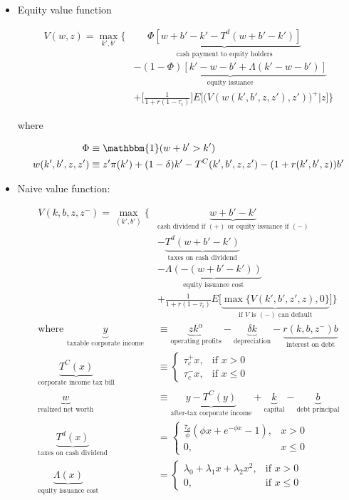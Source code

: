 \documentclass{article}
\newcommand{\one}{\mathbbm{1}}
\begin{document}
\begin{itemize}
\item Equity value function

\begin{align*}
V(w, z) 
= \max_{k', b'} \Bigg\{ &\; \; \;  \;  \; 
\underbrace{\Phi [w + b' - k' - T^d(w + b' - k')]}_{\text{cash payment to equity holders}}\\
&\underbrace{- (1-\Phi) [k' - w - b' + \Lambda(k'-w - b')]}_{\text{equity issuance}}\\
&+ \Bigg[ \frac{1}{1 + r ( 1-\tau_i)}\Bigg] E\Bigg[\Big(V(w(k', b', z, z'), z')\Big)^+\Bigg| z \Bigg]\Bigg\}
\end{align*}

where 

\begin{align*}
\Phi &\equiv \one (w + b' > k')\\
w(k', b', z, z') &\equiv z' \pi(k') + (1-\delta) k' - T^C(k', b', z, z') - (1 +r(k', b', z)) b'
\end{align*}

\pagebreak

\item Naive value function:

\begin{align*}
V(k, b, z, z^-) =
\max_{(k', b')} \Bigg\{ 
& \underbrace{w + b' - k'}_{\text{cash dividend if } (+) \text{ or equity issuance if } (-)} \\ 
&- \underbrace{T^d(w + b' - k')}_{\text{taxes on cash dividend}} \\
&- \underbrace{\Lambda(-(w + b' - k'))}_{\text{equity issuance cost}} \\
&+ \frac{1}{1+r(1-\tau_i)} E\Big[\underbrace{\max\{ V(k', b', z', z), 0\}}_{\text{if }V \text{ is } (-) \text{ can default}}\Big] \Bigg\} \\
\text{where }
\underbrace{y}_{\text{taxable corporate income}} &\equiv \underbrace{z k^\alpha}_{\text{operating profits}} - \underbrace{\delta k}_{\text{depreciation}} - \underbrace{r(k, b, z^-) b}_{\text{interest on debt}} \\
\underbrace{T^C(x)}_{\text{corporate income tax bill}} &\equiv 
\begin{cases} 
\tau_c^+ x, & \text{if }x > 0 \\
\tau_c^- x, & \text{if }x \le 0
\end{cases}\\
\underbrace{w}_{\text{realized net worth}} &\equiv \underbrace{y - T^C(y)}_{\text{after-tax corporate income}}+ \underbrace{k}_{\text{capital}}  - \underbrace{b}_{\text{debt principal}} \\
\underbrace{T^d(x)}_{\text{taxes on cash dividend}} &= 
\begin{cases}
\frac{\bar \tau_d}{\phi}(\phi x + e^{-\phi x} - 1), & x > 0 \\
0,& x \le 0
\end{cases} \\
\underbrace{\Lambda(x)}_{\text{equity issuance cost}} &= 
\begin{cases} 
\lambda_0 + \lambda_1 x + \lambda_2 x^2, & \text{if }x > 0 \\
0, & \text{if }x \le 0
\end{cases}
\end{align*}


\end{itemize}
\end{document}
